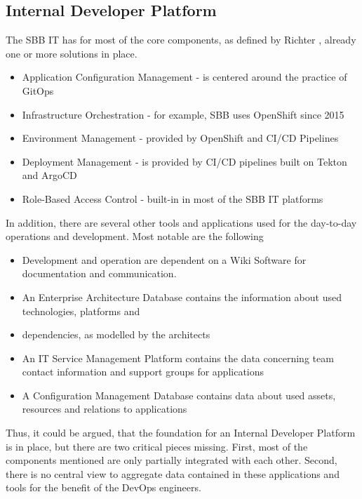 \documentclass[a4paper,12pt]{article}
\begin{document}
    \subsection{Internal Developer Platform}
    \label{subsec:sbbplatform}
    The SBB IT has for most of the core components, as defined by Richter\parencite{richteretal} , already one or
    more solutions in place.
    \begin{itemize}
        \item Application Configuration Management - is centered around the practice of GitOps\parencite{hashicorpvault}
        \item Infrastructure Orchestration - for example, SBB uses OpenShift since 2015\parencite{rhsbbopenshift}
        \item Environment Management - provided by OpenShift and CI/CD Pipelines
        \item Deployment Management - is provided by CI/CD pipelines built on Tekton and ArgoCD\parencite{sbbtekton}
        \item Role-Based Access Control - built-in in most of the SBB IT platforms
    \end{itemize}
    In addition, there are several other tools and applications used for the day-to-day operations and development.
    Most notable are the following
    \begin{itemize}
        \item Development and operation are dependent on a Wiki Software for documentation and communication.
        \item An Enterprise Architecture Database contains the information about used technologies, platforms and
        \item dependencies, as modelled by the architects
        \item An IT Service Management Platform contains the data concerning team contact information and support groups for applications
        \item A Configuration Management Database contains data about used assets, resources and relations to applications
    \end{itemize}
    Thus, it could be argued, that the foundation for an Internal Developer Platform is in place, but there are two
    critical pieces missing.
    First, most of the components mentioned are only partially integrated with each other.
    Second, there is no central view to aggregate data contained in these applications and tools for the benefit of
    the DevOps engineers.
\end{document}

